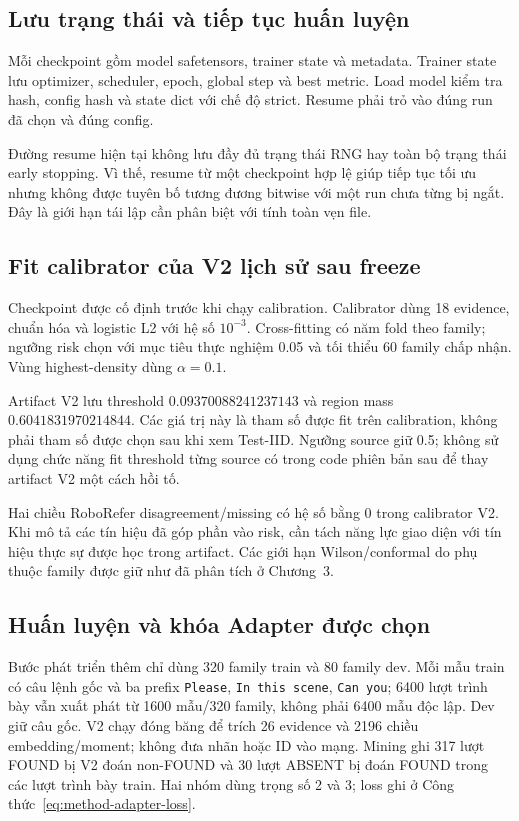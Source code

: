 \subsection{Lưu trạng thái và tiếp tục huấn luyện}

Mỗi checkpoint gồm model safetensors, trainer state
và metadata. Trainer state lưu optimizer, scheduler,
epoch, global step và best metric. Load model kiểm
tra hash, config hash và state dict với chế độ strict.
Resume phải trỏ vào đúng run đã chọn và đúng config.

Đường resume hiện tại không lưu đầy đủ trạng thái
RNG hay toàn bộ trạng thái early stopping. Vì thế,
resume từ một checkpoint hợp lệ giúp tiếp tục tối
ưu nhưng không được tuyên bố tương đương bitwise với
một run chưa từng bị ngắt. Đây là giới hạn tái lập
cần phân biệt với tính toàn vẹn file.

\subsection{Fit calibrator của V2 lịch sử sau freeze}

Checkpoint được cố định trước khi chạy calibration.
Calibrator dùng 18 evidence, chuẩn hóa và logistic
L2 với hệ số $10^{-3}$. Cross-fitting có năm fold
theo family; ngưỡng risk chọn với mục tiêu thực nghiệm
0.05 và tối thiểu 60 family chấp nhận.
Vùng highest-density dùng $\alpha=0.1$.

Artifact V2 lưu threshold
$0.09370088241237143$ và region mass
$0.6041831970214844$. Các giá trị này là tham số
được fit trên calibration, không phải tham số được
chọn sau khi xem Test-IID. Ngưỡng source giữ
0.5; không sử dụng chức năng fit threshold từng
source có trong code phiên bản sau để thay artifact
V2 một cách hồi tố.

Hai chiều RoboRefer disagreement/missing có hệ số
bằng 0 trong calibrator V2. Khi mô tả các tín hiệu
đã góp phần vào risk, cần tách năng lực giao diện
với tín hiệu thực sự được học trong artifact.
Các giới hạn Wilson/conformal do phụ thuộc family
được giữ như đã phân tích ở Chương~3.

\subsection{Huấn luyện và khóa Adapter được chọn}
\label{sec:setup-adapter}

Bước phát triển thêm chỉ dùng 320 family train và 80 family dev.
Mỗi mẫu train có câu lệnh gốc và ba prefix \texttt{Please},
\texttt{In this scene}, \texttt{Can you}; 6400 lượt trình bày vẫn xuất phát
từ 1600 mẫu/320 family, không phải 6400 mẫu độc lập. Dev giữ câu gốc.
V2 chạy đóng băng để trích 26 evidence và 2196 chiều embedding/moment;
không đưa nhãn hoặc ID vào mạng. Mining ghi 317 lượt FOUND bị V2 đoán
non-FOUND và 30 lượt ABSENT bị đoán FOUND trong các lượt trình bày train.
Hai nhóm dùng trọng số 2 và 3; loss ghi ở Công thức~\eqref{eq:method-adapter-loss}.

